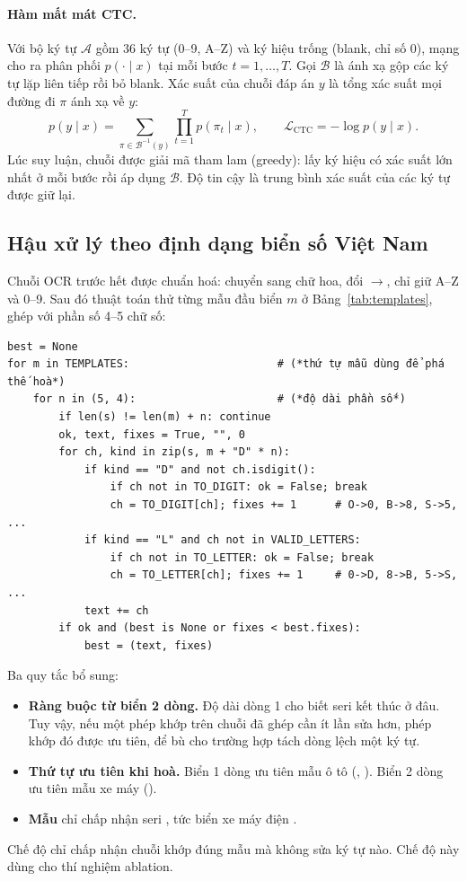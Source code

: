 \paragraph{Hàm mất mát CTC.} Với bộ ký tự $\mathcal{A}$ gồm 36 ký tự (0--9, A--Z) và ký hiệu trống (blank, chỉ số 0), mạng cho ra phân phối $p(\cdot \mid x)$ tại mỗi bước $t = 1,\dots,T$. Gọi $\mathcal{B}$ là ánh xạ gộp các ký tự lặp liên tiếp rồi bỏ blank. Xác suất của chuỗi đáp án $y$ là tổng xác suất mọi đường đi $\pi$ ánh xạ về $y$:
\begin{equation}
  p(y \mid x) = \sum_{\pi \in \mathcal{B}^{-1}(y)} \prod_{t=1}^{T} p(\pi_t \mid x),
  \qquad
  \mathcal{L}_{\text{CTC}} = -\log p(y \mid x).
\end{equation}
Lúc suy luận, chuỗi được giải mã tham lam (greedy): lấy ký hiệu có xác suất lớn nhất ở mỗi bước rồi áp dụng $\mathcal{B}$. Độ tin cậy là trung bình xác suất của các ký tự được giữ lại.

\subsection{Hậu xử lý theo định dạng biển số Việt Nam}
Chuỗi OCR trước hết được chuẩn hoá: chuyển sang chữ hoa, đổi $\to$, chỉ giữ A--Z và 0--9. Sau đó thuật toán thử từng mẫu đầu biển $m$ ở Bảng~\ref{tab:templates}, ghép với phần số 4--5 chữ số:

\begin{lstlisting}[caption={Thuật toán khớp mẫu biển số (rút gọn từ \code{plate\_format.py}).}]
best = None
for m in TEMPLATES:                       # (*thứ tự mẫu dùng để phá thế hoà*)
    for n in (5, 4):                      # (*độ dài phần số*)
        if len(s) != len(m) + n: continue
        ok, text, fixes = True, "", 0
        for ch, kind in zip(s, m + "D" * n):
            if kind == "D" and not ch.isdigit():
                if ch not in TO_DIGIT: ok = False; break
                ch = TO_DIGIT[ch]; fixes += 1      # O->0, B->8, S->5, ...
            if kind == "L" and ch not in VALID_LETTERS:
                if ch not in TO_LETTER: ok = False; break
                ch = TO_LETTER[ch]; fixes += 1     # 0->D, 8->B, 5->S, ...
            text += ch
        if ok and (best is None or fixes < best.fixes):
            best = (text, fixes)
\end{lstlisting}

Ba quy tắc bổ sung:
\begin{itemize}[nosep]
  \item \textbf{Ràng buộc từ biển 2 dòng.} Độ dài dòng 1 cho biết seri kết thúc ở đâu. Tuy vậy, nếu một phép khớp trên chuỗi đã ghép cần ít lần sửa hơn, phép khớp đó được ưu tiên, để bù cho trường hợp tách dòng lệch một ký tự.
  \item \textbf{Thứ tự ưu tiên khi hoà.} Biển 1 dòng ưu tiên mẫu ô tô (, ). Biển 2 dòng ưu tiên mẫu xe máy ().
  \item \textbf{Mẫu } chỉ chấp nhận seri , tức biển xe máy điện .
\end{itemize}
Chế độ  chỉ chấp nhận chuỗi khớp đúng mẫu mà không sửa ký tự nào. Chế độ này dùng cho thí nghiệm ablation.

